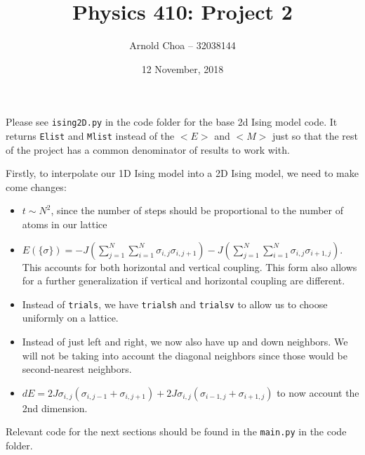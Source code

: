 \documentclass[10pt]{article} %
\title{Physics 410: Project 2}
\author{Arnold Choa -- 32038144}
\date{12 November, 2018} %
\begin{document}
\maketitle
Please see \texttt{ising2D.py} in the code folder for the base 2d Ising model code. It returns \texttt{Elist} and \texttt{Mlist} instead of the $<E>$ and $<M>$ just so that the rest of the project has a common denominator of results to work with.

Firstly, to interpolate our 1D Ising model into a 2D Ising model, we need to make come changes:
\begin{itemize}
	\item $t \sim N^2$, since the number of steps should be  proportional to the number of atoms in our lattice
	\item $E(\{\sigma \}) = -J\left(\sum_{j=1}^{N}\sum_{i=1}^{N} \sigma_{i,j}\sigma_{i,j+1}\right) -J\left(\sum_{j=1}^{N}\sum_{i=1}^{N} \sigma_{i,j}\sigma_{i+1,j}\right)$. This accounts for both horizontal and vertical coupling. This form also allows for a further generalization if vertical and horizontal coupling are different.
	\item Instead of \texttt{trials}, we have \texttt{trialsh} and \texttt{trialsv} to allow us to choose uniformly on a lattice.
	\item Instead of just left and right, we now also have up and down neighbors. We will not be taking into account the diagonal neighbors since those would be second-nearest 
neighbors.
	\item $dE = 2J\sigma_{i,j}\left(\sigma_{i,j-1} + \sigma_{i,j+1}\right) + 2J\sigma_{i,j}\left(\sigma_{i-1,j} + \sigma_{i+1,j}\right)$ to now account the 2nd dimension.
\end{itemize}

Relevant code for the next sections should be found in the \texttt{main.py} in the code folder.
\end{document}

